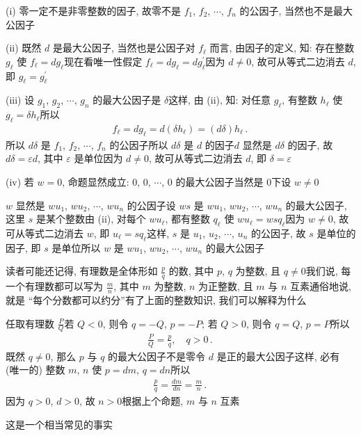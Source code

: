 \begin{pf}
    (i) 零一定不是非零整数的因子, 故零不是 $f_1$, $f_2$, $\cdots$, $f_n$ 的公因子, 当然也不是最大公因子\period

    (ii) 既然 $d$ 是最大公因子, 当然也是公因子\period 对 $f_{\ell}$ 而言, 由因子的定义, 知: 存在整数 $g_{\ell}$ 使 $f_{\ell} = dg_{\ell}$\period 现在看唯一性\period 假定 $f_{\ell} = dg_{\ell} = dg_{\ell}^{\prime}$\period 因为 $d \neq 0$, 故可从等式二边消去 $d$, 即 $g_{\ell} = g_{\ell}^{\prime}$\period

    (iii) 设 $g_1$, $g_2$, $\cdots$, $g_n$ 的最大公因子是 $\delta$\period 这样, 由 (ii), 知: 对任意 $g_{\ell}$, 有整数 $h_{\ell}$ 使 $g_{\ell} = \delta h_{\ell}$\period 所以
    \begin{align*}
        f_{\ell} = dg_{\ell} = d(\delta h_{\ell}) = (d\delta) h_{\ell} \period
    \end{align*}
    所以 $d\delta$ 是 $f_1$, $f_2$, $\cdots$, $f_n$ 的公因子\period 所以 $d\delta$ 是 $d$ 的因子\period $d$ 显然是 $d\delta$ 的因子, 故 $d\delta = \varepsilon d$, 其中 $\varepsilon$ 是单位\period 因为 $d \neq 0$, 故可从等式二边消去 $d$, 即 $\delta = \varepsilon$\period

    (iv) 若 $w = 0$, 命题显然成立: $0$, $0$, $\cdots$, $0$ 的最大公因子当然是 $0$\period 下设 $w \neq 0$\period

    $w$ 显然是 $wu_1$, $wu_2$, $\cdots$, $wu_n$ 的公因子\period 设 $ws$ 是 $wu_1$, $wu_2$, $\cdots$, $wu_n$ 的最大公因子, 这里 $s$ 是某个整数\period 由 (ii), 对每个 $wu_{\ell}$, 都有整数 $q_{\ell}$ 使 $wu_{\ell} = wsq_{\ell}$\period 因为 $w \neq 0$, 故可从等式二边消去 $w$, 即 $u_{\ell} = sq_{\ell}$\period 这样, $s$ 是 $u_1$, $u_2$, $\cdots$, $u_n$ 的公因子, 故 $s$ 是单位的因子, 即 $s$ 是单位\period 所以 $w$ 是 $wu_1$, $wu_2$, $\cdots$, $wu_n$ 的最大公因子\period
\end{pf}

\begin{example}
    读者可能还记得, 有理数是全体形如 $\frac{p}{q}$ 的数, 其中 $p$, $q$ 为整数, 且 $q \neq 0$\period 我们说, 每一个有理数都可以写为 $\frac{m}{n}$, 其中 $m$ 为整数, $n$ 为正整数, 且 $m$ 与 $n$ 互素\period 通俗地说, 就是 ``每个分数都可以约分''\period 有了上面的整数知识, 我们可以解释为什么\period

    任取有理数 $\frac{P}{Q}$\period 若 $Q < 0$, 则令 $q = -Q$, $p = -P$; 若 $Q > 0$, 则令 $q = Q$, $p = P$\period 所以
    \begin{align*}
        \frac{P}{Q} = \frac{p}{q}, \quad q > 0 \period
    \end{align*}
    既然 $q \neq 0$, 那么 $p$ 与 $q$ 的最大公因子不是零\period 令 $d$ 是正的最大公因子\period 这样, 必有 (唯一的) 整数 $m$, $n$ 使 $p = dm$, $q = dn$\period 所以
    \begin{align*}
        \frac{p}{q} = \frac{dm}{dn} = \frac{m}{n} \period
    \end{align*}
    因为 $q > 0$, $d > 0$, 故 $n > 0$\period 根据上个命题, $m$ 与 $n$ 互素\period

    这是一个相当常见的事实\period
\end{example}

